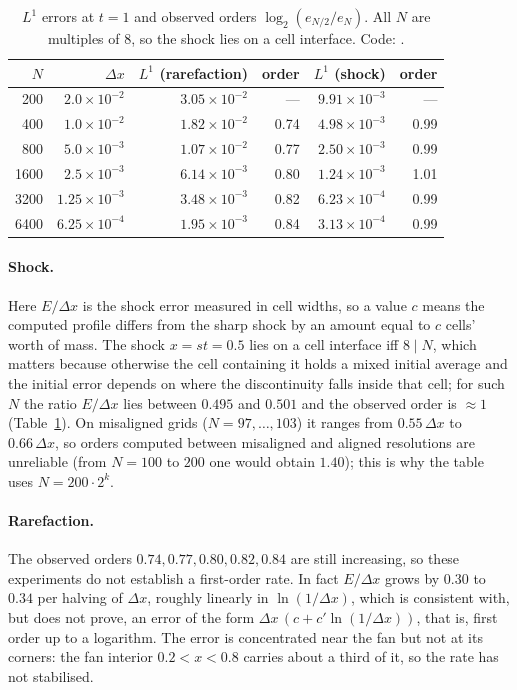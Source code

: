 \begin{table}[htbp]
\centering
\begin{tabular}{r r r r r r}
  $N$ & $\Delta x$ & $L^1$ (rarefaction) & order & $L^1$ (shock) & order \\\hline
  200  & $2.0\times10^{-2}$ & $3.05\times10^{-2}$ & --- & $9.91\times10^{-3}$ & --- \\
  400  & $1.0\times10^{-2}$ & $1.82\times10^{-2}$ & 0.74 & $4.98\times10^{-3}$ & 0.99 \\
  800  & $5.0\times10^{-3}$ & $1.07\times10^{-2}$ & 0.77 & $2.50\times10^{-3}$ & 0.99 \\
  1600 & $2.5\times10^{-3}$ & $6.14\times10^{-3}$ & 0.80 & $1.24\times10^{-3}$ & 1.01 \\
  3200 & $1.25\times10^{-3}$ & $3.48\times10^{-3}$ & 0.82 & $6.23\times10^{-4}$ & 0.99 \\
  6400 & $6.25\times10^{-4}$ & $1.95\times10^{-3}$ & 0.84 & $3.13\times10^{-4}$ & 0.99
\end{tabular}
\caption{$L^1$ errors at $t=1$ and observed orders $\log_2(e_{N/2}/e_N)$.
All $N$ are multiples of $8$, so the shock lies on a cell interface. Code: \cite{code}.}
\label{tab:godunov-conv}
\end{table}

\paragraph{Shock.} Here $E/\Delta x$ is the shock error measured in cell widths, so a value $c$ means the
computed profile differs from the sharp shock by an amount equal to $c$ cells'
worth of mass. The shock $x=st=0.5$ lies on a cell interface iff $8\mid N$, which
matters because otherwise the cell containing it holds a mixed initial average and
the initial error depends on where the discontinuity falls inside that cell;
for such $N$ the ratio $E/\Delta x$ lies between $0.495$ and $0.501$ and the
observed order is $\approx1$ (Table~\ref{tab:godunov-conv}). On misaligned grids
($N=97,\dots,103$) it ranges from $0.55\,\Delta x$ to $0.66\,\Delta x$, so orders
computed between misaligned and aligned resolutions are unreliable (from $N=100$ to
$200$ one would obtain $1.40$); this is why the table uses $N=200\cdot2^k$.

\paragraph{Rarefaction.} The observed orders $0.74,0.77,0.80,0.82,0.84$ are still
increasing, so these experiments do not establish a first-order rate. In fact
$E/\Delta x$ grows by $0.30$ to $0.34$ per halving of $\Delta x$, roughly linearly in
$\ln(1/\Delta x)$, which is consistent with, but does not prove, an error of the form
$\Delta x\,(c+c'\ln(1/\Delta x))$, that is, first order up to a logarithm. The error is
concentrated near the fan but not at its corners: the fan interior $0.2<x<0.8$
carries about a third of it, so the rate has not stabilised.

